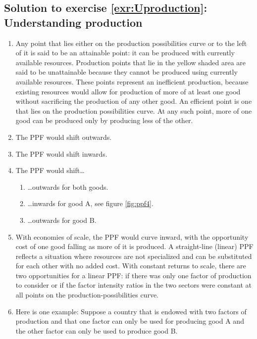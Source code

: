 \documentclass[
  12pt,
  oneside]{book}
\providecommand{\tightlist}{%
  \setlength{\itemsep}{0pt}\setlength{\parskip}{0pt}}
\theoremstyle{definition}
\theoremstyle{definition}
\theoremstyle{definition}
\theoremstyle{definition}
\theoremstyle{remark}
\begin{document}
\hypertarget{sol:Uproduction}{%
\subsection*{Solution to exercise \ref{exr:Uproduction}: Understanding production}\label{sol:Uproduction}}

\begin{enumerate}
\def\labelenumi{\alph{enumi})}
\item
  Any point that lies either on the production possibilities curve or to the left of it is said to be an attainable point: it can be produced with currently available resources. Production points that lie in the yellow shaded area are said to be unattainable because they cannot be produced using currently available resources. These points represent an inefficient production, because existing resources would allow for production of more of at least one good without sacrificing the production of any other good. An efficient point is one that lies on the production possibilities curve. At any such point, more of one good can be produced only by producing less of the other.
\item
  The PPF would shift outwards.
\item
  The PPF would shift inwards.\\
\item
  The PPF would shift\ldots{}

  \begin{enumerate}
  \def\labelenumii{\roman{enumii})}
  \tightlist
  \item
    \ldots outwards for both goods.
  \item
    \ldots inwards for good A, see figure \ref{fig:ppf4}.
  \item
    \ldots outwards for good B.
  \end{enumerate}
\item
  With economies of scale, the PPF would curve inward, with the opportunity cost of one good falling as more of it is produced. A straight-line (linear) PPF reflects a situation where resources are not specialized and can be substituted for each other with no added cost. With constant returns to scale, there are two opportunities for a linear PPF: if there was only one factor of production to consider or if the factor intensity ratios in the two sectors were constant at all points on the production-possibilities curve.
\item
  Here is one example: Suppose a country that is endowed with two factors of production and that one factor can only be used for producing good A and the other factor can only be used to produce good B.
\end{enumerate}
\end{document}
